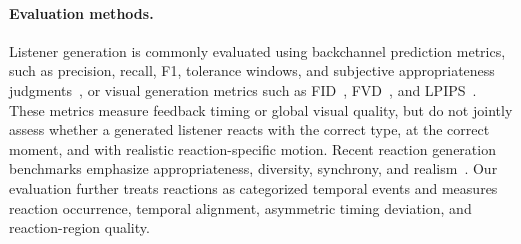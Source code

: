 \paragraph{Evaluation methods.}
Listener generation is commonly evaluated using backchannel prediction metrics, such as precision, recall, F1, tolerance windows, and subjective appropriateness judgments~\cite{morency2008predicting,dekok2012survey}, or visual generation metrics such as FID~\cite{Seitzer2020FID}, FVD~\cite{unterthiner2018fvd}, and LPIPS~\cite{zhang2018lpips}. These metrics measure feedback timing or global visual quality, but do not jointly assess whether a generated listener reacts with the correct type, at the correct moment, and with realistic reaction-specific motion. Recent reaction generation benchmarks emphasize appropriateness, diversity, synchrony, and realism~\cite{song2023fmarg,song2024react}. Our evaluation further treats reactions as categorized temporal events and measures reaction occurrence, temporal alignment, asymmetric timing deviation, and reaction-region quality.